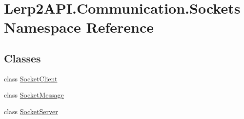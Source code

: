 \hypertarget{namespace_lerp2_a_p_i_1_1_communication_1_1_sockets}{}\section{Lerp2\+A\+P\+I.\+Communication.\+Sockets Namespace Reference}
\label{namespace_lerp2_a_p_i_1_1_communication_1_1_sockets}
\subsection*{Classes}
\begin{DoxyCompactItemize}
\item 
class \hyperlink{class_lerp2_a_p_i_1_1_communication_1_1_sockets_1_1_socket_client}{Socket\+Client}
\item 
class \hyperlink{class_lerp2_a_p_i_1_1_communication_1_1_sockets_1_1_socket_message}{Socket\+Message}
\item 
class \hyperlink{class_lerp2_a_p_i_1_1_communication_1_1_sockets_1_1_socket_server}{Socket\+Server}
\end{DoxyCompactItemize}
